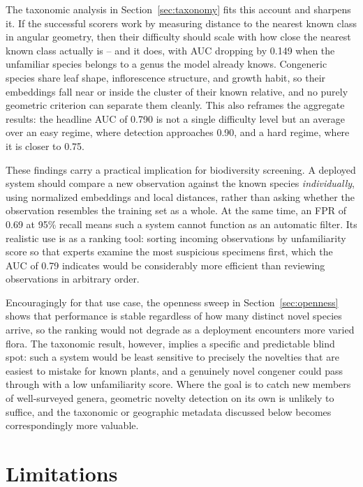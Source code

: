 \documentclass[11pt]{article}
\begin{document}
The taxonomic analysis in Section~\ref{sec:taxonomy} fits this account and sharpens it. If the successful scorers work by measuring distance to the nearest known class in angular geometry, then their difficulty should scale with how close the nearest known class actually is -- and it does, with AUC dropping by 0.149 when the unfamiliar species belongs to a genus the model already knows. Congeneric species share leaf shape, inflorescence structure, and growth habit, so their embeddings fall near or inside the cluster of their known relative, and no purely geometric criterion can separate them cleanly. This also reframes the aggregate results: the headline AUC of 0.790 is not a single difficulty level but an average over an easy regime, where detection approaches 0.90, and a hard regime, where it is closer to 0.75.

These findings carry a practical implication for biodiversity screening. A deployed system should compare a new observation against the known species \emph{individually}, using normalized embeddings and local distances, rather than asking whether the observation resembles the training set as a whole. At the same time, an FPR of 0.69 at 95\% recall means such a system cannot function as an automatic filter. Its realistic use is as a ranking tool: sorting incoming observations by unfamiliarity score so that experts examine the most suspicious specimens first, which the AUC of 0.79 indicates would be considerably more efficient than reviewing observations in arbitrary order.

Encouragingly for that use case, the openness sweep in Section~\ref{sec:openness} shows that performance is stable regardless of how many distinct novel species arrive, so the ranking would not degrade as a deployment encounters more varied flora. The taxonomic result, however, implies a specific and predictable blind spot: such a system would be least sensitive to precisely the novelties that are easiest to mistake for known plants, and a genuinely novel congener could pass through with a low unfamiliarity score. Where the goal is to catch new members of well-surveyed genera, geometric novelty detection on its own is unlikely to suffice, and the taxonomic or geographic metadata discussed below becomes correspondingly more valuable.

\section{Limitations}
\label{sec:limitations}
\end{document}

